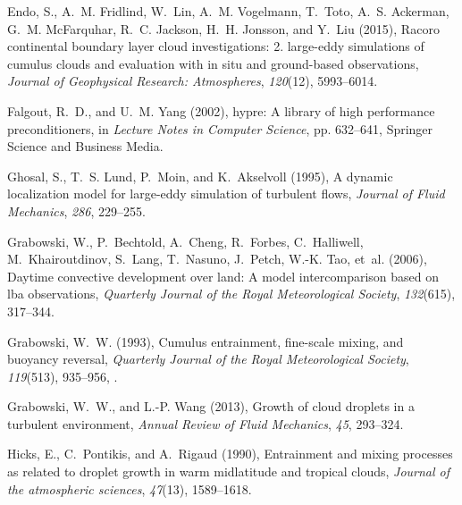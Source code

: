\documentclass[draft,linenumbers]{AGUJournal}
\begin{document}
\begin{thebibliography}{60}
Endo, S., A.~M. Fridlind, W.~Lin, A.~M. Vogelmann, T.~Toto, A.~S. Ackerman,
  G.~M. McFarquhar, R.~C. Jackson, H.~H. Jonsson, and Y.~Liu (2015), Racoro
  continental boundary layer cloud investigations: 2. large-eddy simulations of
  cumulus clouds and evaluation with in situ and ground-based observations,
  \textit{Journal of Geophysical Research: Atmospheres}, \textit{120}(12),
  5993--6014.

Falgout, R.~D., and U.~M. Yang (2002), hypre: A library of high performance
  preconditioners, in \textit{Lecture Notes in Computer Science}, pp. 632--641,
  Springer Science and Business Media.

Ghosal, S., T.~S. Lund, P.~Moin, and K.~Akselvoll (1995), A dynamic
  localization model for large-eddy simulation of turbulent flows,
  \textit{Journal of Fluid Mechanics}, \textit{286}, 229--255.

Grabowski, W., P.~Bechtold, A.~Cheng, R.~Forbes, C.~Halliwell,
  M.~Khairoutdinov, S.~Lang, T.~Nasuno, J.~Petch, W.-K. Tao, et~al. (2006),
  Daytime convective development over land: A model intercomparison based on
  lba observations, \textit{Quarterly Journal of the Royal Meteorological
  Society}, \textit{132}(615), 317--344.

Grabowski, W.~W. (1993), Cumulus entrainment, fine-scale mixing, and buoyancy
  reversal, \textit{Quarterly Journal of the Royal Meteorological Society},
  \textit{119}(513), 935--956, .

Grabowski, W.~W., and L.-P. Wang (2013), Growth of cloud droplets in a
  turbulent environment, \textit{Annual Review of Fluid Mechanics},
  \textit{45}, 293--324.

Hicks, E., C.~Pontikis, and A.~Rigaud (1990), Entrainment and mixing processes
  as related to droplet growth in warm midlatitude and tropical clouds,
  \textit{Journal of the atmospheric sciences}, \textit{47}(13), 1589--1618.


\end{thebibliography}
\end{document}
